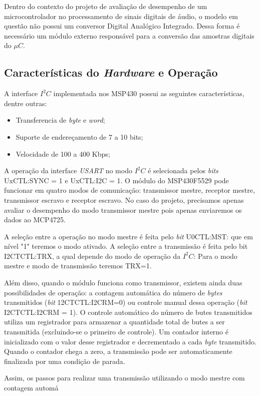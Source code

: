		Dentro do contexto do projeto de avaliação de desempenho de um microcontrolador no processamento de sinais digitais de áudio, o modelo em questão não possui um conversor Digital Analógico Integrado. Dessa forma é necessário um módulo externo responsável para a conversão das amostras digitais do $\mu C$.
		
	\subsection{Características do \textit{Hardware} e Operação}
	
		A interface $ I^2C $ implementada nos MSP430 possui as seguintes características, dentre outras:
		\begin{itemize}
			\item Transferencia de \textit{byte} e \textit{word};
			\item Suporte de endereçamento de 7 a 10 bits;
			\item Velocidade de 100 a 400 Kbps;
		\end{itemize}
	
		A operação da interface \textit{USART} no modo $ I^2C $ é selecionada pelos \textit{bits} UxCTL:SYNC = 1 e UxCTL:I2C = 1. O módulo do MSP430F5529 pode funcionar em quatro modos de comunicação: transmissor mestre, receptor mestre, transmissor escravo e receptor escravo. No caso do projeto, precisamos apenas avaliar o desempenho do modo transmissor mestre pois apenas enviaremos os dados ao MCP4725.
		
		A seleção entre a operação no modo mestre é feita pelo \textit{bit} U0CTL:MST: que em nível "1" teremos o modo ativado. A seleção entre a transmissão é feita pelo bit I2CTCTL:TRX, a qual depende do modo de operação da $ I^2C $: Para o modo mestre e modo de transmissão teremos TRX=1.
		
		Além disso, quando o módulo funciona como transmissor, existem ainda duas possibilidades de operação: a contagem automática do número de \textit{bytes} transmitidos (\textit{bit} 12CTCTL:I2CRM=0) ou controle manual dessa operação (\textit{bit} I2CTCTL:I2CRM = 1). O controle automático do número de butes transmitidos utiliza um registrador para armazenar a quantidade total de butes a ser transmitida (excluindo-se o primeiro de controle). Um contador interno é inicializado com o valor desse registrador e decrementado a cada \textit{byte} transmitido. Quando o contador chega a zero, a transmissão pode ser automaticamente finalizada por uma condição de parada.
		
		Assim, os passos para realizar uma transmissão utilizando o modo mestre com contagem automá
		
			
		
		
		 
		
		